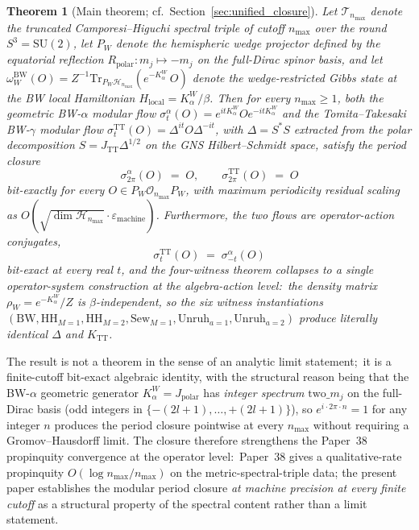 \documentclass[11pt,a4paper]{article}
\theoremstyle{plain}
\newtheorem{theorem}{Theorem}[section]
\theoremstyle{definition}
\newcommand{\nmax}{n_{\max}}
\newcommand{\sthree}{S^{3}}
\newcommand{\Hilb}{\mathcal{H}}
\newcommand{\Op}{\mathcal{O}}
\newcommand{\Tcal}{\mathcal{T}}
\newcommand{\SU}{\mathrm{SU}}
\newcommand{\Tr}{\mathrm{Tr}}
\newcommand{\TT}{\mathrm{TT}}
\newcommand{\BW}{\mathrm{BW}}
\newcommand{\HH}{\mathrm{HH}}
\newcommand{\Sew}{\mathrm{Sew}}
\newcommand{\Unruh}{\mathrm{Unruh}}
\begin{document}
\begin{theorem}[Main theorem; cf.~Section~\ref{sec:unified_closure}]
\label{thm:main_intro}
Let $\Tcal_{\nmax}$ denote the truncated Camporesi--Higuchi spectral
triple of cutoff $\nmax$ over the round $\sthree = \SU(2)$, let
$P_W$ denote the hemispheric wedge projector defined by the equatorial
reflection $R_{\mathrm{polar}}: m_j \mapsto -m_j$ on the full-Dirac
spinor basis, and let
$\omega_W^{\BW}(O) = Z^{-1} \Tr_{P_W \Hilb_{\nmax}}(e^{-K_\alpha^W}\,O)$
denote the wedge-restricted Gibbs state at the BW local Hamiltonian
$H_{\mathrm{local}} = K_\alpha^W / \beta$. Then for every $\nmax \ge
1$, both the geometric BW-$\alpha$ modular flow
$\sigma_t^{\alpha}(O) = e^{itK_\alpha^W} O e^{-itK_\alpha^W}$ and the
Tomita--Takesaki BW-$\gamma$ modular flow $\sigma_t^{\TT}(O) =
\Delta^{it} O \Delta^{-it}$, with $\Delta = S^* S$ extracted from the
polar decomposition $S = J_{\TT} \Delta^{1/2}$ on the GNS Hilbert--Schmidt
space, satisfy the period closure
\begin{equation}\label{eq:period_closure_main}
   \sigma_{2\pi}^{\alpha}(O) \;=\; O,\qquad
   \sigma_{2\pi}^{\TT}(O) \;=\; O
\end{equation}
bit-exactly for every $O \in P_W \Op_{\nmax} P_W$, with maximum
periodicity residual scaling as
$O(\sqrt{\dim \Hilb_{\nmax}} \cdot \varepsilon_{\mathrm{machine}})$.
Furthermore, the two flows are operator-action conjugates,
\begin{equation}\label{eq:tt_alpha_conjugate_main}
   \sigma_t^{\TT}(O) \;=\; \sigma_{-t}^{\alpha}(O)
\end{equation}
bit-exact at every real $t$, and the four-witness theorem collapses
to a single operator-system construction at the algebra-action level:\
the density matrix $\rho_W = e^{-K_\alpha^W}/Z$ is $\beta$-independent,
so the six witness instantiations $(\BW, \HH_{M=1}, \HH_{M=2},
\Sew_{M=1}, \Unruh_{a=1}, \Unruh_{a=2})$ produce literally identical
$\Delta$ and $K_{\TT}$.
\end{theorem}

The result is not a theorem in the sense of an analytic limit
statement;\ it is a finite-cutoff bit-exact algebraic identity, with
the structural reason being that the BW-$\alpha$ geometric generator
$K_\alpha^W = J_{\mathrm{polar}}$ has \emph{integer spectrum}
$\mathrm{two}\_m_j$ on the full-Dirac basis (odd integers
in $\{-(2l+1), \ldots, +(2l+1)\}$), so $e^{i \cdot 2\pi \cdot n} = 1$
for any integer $n$ produces the period closure pointwise at every
$\nmax$ without requiring a Gromov--Hausdorff limit. The closure
therefore strengthens the Paper~38 propinquity convergence at the
operator level:\ Paper~38 gives a qualitative-rate propinquity
$O(\log \nmax / \nmax)$ on the metric-spectral-triple data; the
present paper establishes the modular period closure
\emph{at machine precision at every finite cutoff} as a structural
property of the spectral content rather than a limit statement.
\end{document}
